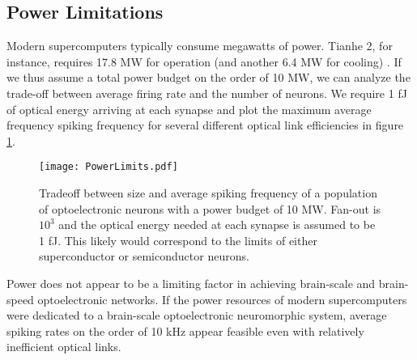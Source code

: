 \documentclass[twocolumn]{article}
\begin{document}
\subsection{Power Limitations}
Modern supercomputers typically consume megawatts of power. Tianhe 2, for instance, requires 17.8 MW for operation (and another 6.4 MW for cooling) \cite{tolpygo2016superconductor}. If we thus assume a total power budget on the order of 10 MW, we can analyze the trade-off between average firing rate and the number of neurons. We require 1 fJ of optical energy arriving at each synapse and plot the maximum average frequency spiking frequency for several different optical link efficiencies in figure \ref{fig:freq_size}.

\begin{figure}[H]
    \centering
    \texttt{[image: PowerLimits.pdf]}
    \caption{Tradeoff between size and average spiking frequency of a population of optoelectronic neurons with a power budget of 10 MW. Fan-out is $10^3$ and the optical energy needed at each synapse is assumed to be 1 fJ. This likely would correspond to the limits of either superconductor or semiconductor neurons.}
    \label{fig:freq_size}
\end{figure}

Power does not appear to be a limiting factor in achieving brain-scale and brain-speed optoelectronic networks. If the power resources of modern supercomputers were dedicated to a brain-scale optoelectronic neuromorphic system, average spiking rates on the order of 10 kHz appear feasible even with relatively inefficient optical links. 
\end{document}
